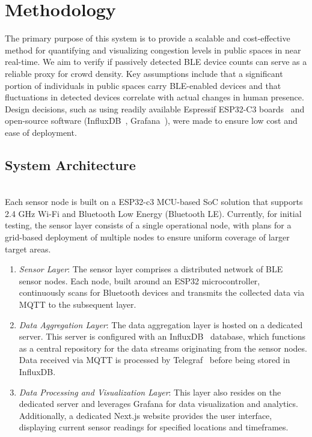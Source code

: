 \documentclass[runningheads]{llncs}
\begin{document}
\section{Methodology}
The primary purpose of this system is to provide a scalable and cost-effective method for quantifying and visualizing congestion levels in public spaces in near real-time. We aim to verify if passively detected BLE device counts can serve as a reliable proxy for crowd density. Key assumptions include that a significant portion of individuals in public spaces carry BLE-enabled devices and that fluctuations in detected devices correlate with actual changes in human presence. Design decisions, such as using readily available Espressif ESP32-C3 boards~\cite{Espressif} and open-source software (InfluxDB~\cite{InfluxDB}, Grafana~\cite{Grafana}), were made to ensure low cost and ease of deployment.
\subsection{System Architecture}

\\
Each sensor node is built on a ESP32-c3 MCU-based SoC solution that supports 2.4 GHz Wi-Fi and Bluetooth Low Energy (Bluetooth LE)\cite{Espressif_Datasheet}. Currently, for initial testing, the sensor layer consists of a single operational node, with plans for a grid-based deployment of multiple nodes to ensure uniform coverage of larger target areas.
\begin{enumerate}
\item \emph{Sensor Layer}: The sensor layer comprises a distributed network of BLE sensor nodes. Each node, built around an ESP32 microcontroller, continuously scans for Bluetooth devices and transmits the collected data via MQTT\cite{MQTT} to the subsequent layer.
\item \emph{Data Aggregation Layer}: The data aggregation layer is hosted on a dedicated server. This server is configured with an InfluxDB~\cite{InfluxDB} database, which functions as a central repository for the data streams originating from the sensor nodes. Data received via MQTT is processed by Telegraf~\cite{Telegraf} before being stored in InfluxDB.
\item \emph{Data Processing and Visualization Layer}: This layer also resides on the dedicated server and leverages Grafana for data visualization and analytics. Additionally, a dedicated Next.js website provides the user interface, displaying current sensor readings for specified locations and timeframes.
\end{enumerate}
\end{document}
